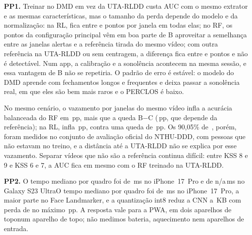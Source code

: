 \documentclass[conference]{IEEEtran}
\providecommand{\CelularSamsungTotalPcinquentaInteiro}{n/a}
\begin{document}
\textbf{PP1.} Treinar no DMD em vez da UTA-RLDD custa AUC com o mesmo extrator e as mesmas características, mas o tamanho da perda depende do modelo e da normalização: na RL, fica entre \ExpCincoBLRQuedaNormMin{} e \ExpCincoBLRQuedaNormMax{} pontos por janela em todas elas; no RF, os \ExpCincoBQuedaAUCJanela{} pontos da configuração principal vêm em boa parte de B aproveitar a semelhança entre as janelas alertas e a referência tirada do mesmo vídeo; com outra referência na UTA-RLDD ou sem centragem, a diferença fica entre \ExpCincoBQuedaOutrasNormMin{} e \ExpCincoBQuedaOutrasNormMax{} pontos e não é detectável. Num app, a calibração e a sonolência acontecem na mesma sessão, e essa vantagem de B não se repetiria. O padrão de erro é estável: o modelo do DMD aprende com fechamentos longos e frequentes e deixa passar a sonolência real, em que eles são bem mais raros e o PERCLOS é baixo.

No mesmo cenário, o vazamento por janelas do mesmo vídeo infla a acurácia balanceada do RF em \ExpCincoBVazamentoAcBal\,pp, mais que a queda B$-$C (\ExpCincoBQuedaAcBalJanela\,pp, que depende da referência); na RL, infla \ExpCincoBLRVazamentoAcBal\,pp, contra uma queda de \ExpCincoBLRQuedaAcBalJanela\,pp. Os 90,05\% de~\cite{lyu2018}, porém, foram medidos no conjunto de avaliação oficial do NTHU-DDD, com pessoas que não estavam no treino, e a distância até a UTA-RLDD não se explica por esse vazamento. Separar vídeos que não são a referência continua difícil: entre KSS 8 e 9 e KSS 6 e 7, a AUC fica em \ExpCincoBControleAUCCincoDezB{} mesmo com o RF treinado na UTA-RLDD.

\textbf{PP2.} \ifSamsungMedido O tempo mediano por quadro foi de \CelularIPhoneTotalPcinquentaInteiro\,ms no iPhone~17~Pro e de \CelularSamsungTotalPcinquentaInteiro\,ms no Galaxy S23 Ultra\else O tempo mediano por quadro foi de \CelularIPhoneTotalPcinquentaInteiro\,ms no iPhone~17~Pro\fi, a maior parte no Face Landmarker, e a quantização int8 reduz a CNN a \ExpQuatroCNNIntKB\,KB com perda de no máximo \ExpQuatroQuedaQuantizacaoMax\,pp. A resposta vale para a PWA, \ifSamsungMedido em dois aparelhos de topo\else num aparelho de topo\fi; não medimos bateria, aquecimento nem aparelhos de entrada.
\end{document}
